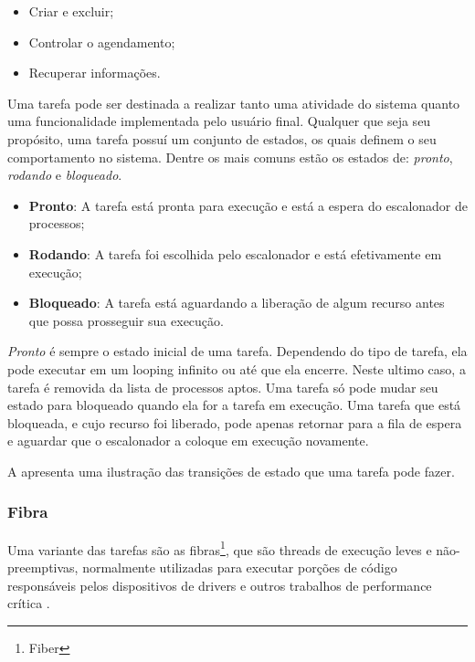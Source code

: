 \begin{itemize}
	\item Criar e excluir;
	\item Controlar o agendamento;
	\item Recuperar informações.
\end{itemize}

Uma tarefa pode ser destinada a realizar tanto uma atividade do sistema quanto uma funcionalidade implementada pelo usuário final. Qualquer que seja seu propósito, uma tarefa possuí um conjunto de estados, os quais definem o seu comportamento no sistema. Dentre os mais comuns estão os estados de: \emph{pronto}, \emph{rodando} e \emph{bloqueado}.

\begin{itemize}
	\item \textbf{Pronto}: A tarefa está pronta para execução e está a espera do escalonador de processos;
	\item \textbf{Rodando}: A tarefa foi escolhida pelo escalonador e está efetivamente em execução;
	\item \textbf{Bloqueado}: A tarefa está aguardando a liberação de algum recurso antes que possa prosseguir sua execução.
\end{itemize}

\emph{Pronto} é  sempre o estado inicial de uma tarefa. Dependendo do tipo de tarefa, ela pode executar em um looping infinito ou até que ela encerre. Neste ultimo caso, a tarefa é removida da lista de processos aptos. Uma tarefa só pode mudar seu estado para bloqueado quando ela for a tarefa em execução. Uma tarefa que está bloqueada, e cujo recurso foi liberado, pode apenas retornar para a fila de espera e aguardar que o escalonador a coloque em execução novamente.

A  apresenta uma ilustração das transições de estado que uma tarefa pode fazer.


\subsubsection{Fibra}

Uma variante das tarefas são as fibras\footnote{Fiber}, que são threads de execução leves e não-preemptivas, normalmente utilizadas para executar porções de código responsáveis pelos dispositivos de drivers e outros trabalhos de performance crítica \cite{rocket}.

